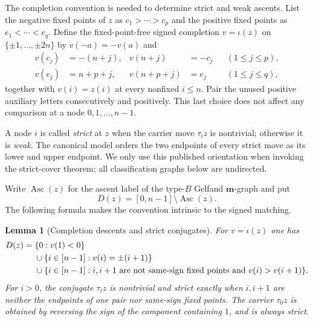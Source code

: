 \documentclass[11pt]{article}
\newtheorem{lemma}[theorem]{Lemma}
\theoremstyle{definition}
\theoremstyle{remark}
\newcommand{\Asc}{\operatorname{Asc}}
\newcommand{\mgraph}{\mathbf m}
\begin{document}
The completion convention is needed to determine strict and weak
ascents.  List the negative fixed points of $z$ as
$c_1>\cdots>c_p$ and the positive fixed points as
$e_1<\cdots<e_q$.  Define the fixed-point-free signed completion
$v=\iota(z)$ on $\{\pm1,\ldots,\pm2n\}$ by $v(-a)=-v(a)$ and
\begin{align}
 v(c_j)&=-(n+j),&v(n+j)&=-c_j &&(1\leq j\leq p),\label{eq:neg-completion}\\
 v(e_j)&=n+p+j,&v(n+p+j)&=e_j &&(1\leq j\leq q),\label{eq:pos-completion}
\end{align}
together with $v(i)=z(i)$ at every nonfixed $i\leq n$.  Pair the unused
positive auxiliary letters consecutively and positively.  This last
choice does not affect any comparison at a node $0,1,\ldots,n-1$.

A node $i$ is called \emph{strict} at $z$ when the carrier move
$\tau_i z$ is nontrivial; otherwise it is \emph{weak}.  The canonical
model orders the two endpoints of every strict move as its lower and upper
endpoint.  We only use this published orientation when invoking the
strict-cover theorem; all classification graphs below are undirected.

Write $\Asc(z)$ for the ascent label of the type-$B$ Gelfand $\mgraph$-graph
and put
\[
                         D(z)=[0,n-1]\setminus\Asc(z).
\]
The following formula makes the convention intrinsic to the signed
matching.

\begin{lemma}[Completion descents and strict conjugates]
\label{lem:completion}
For $v=\iota(z)$ one has
\begin{align}
 D(z)={}&\{0:v(1)<0\}\notag\\
 &\cup\{i\in[n-1]:v(i)=\pm(i+1)\}\notag\\
 &\cup\{i\in[n-1]:i,i+1\text{ are not same-sign fixed points and }
                                  v(i)>v(i+1)\}.\label{eq:descent-formula}
\end{align}
For $i>0$, the conjugate $\tau_i z$ is nontrivial and strict exactly when
$i,i+1$ are neither the endpoints of one pair nor same-sign fixed points.
The carrier $\tau_0z$ is obtained by reversing the sign of the component
containing $1$, and is always strict.
\end{lemma}
\end{document}
